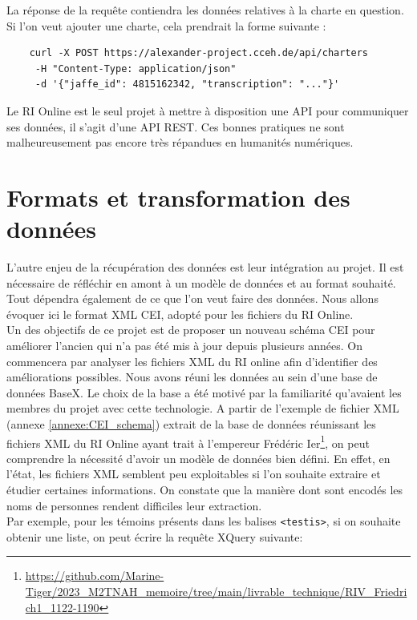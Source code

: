 \noindent La réponse de la requête contiendra les données relatives à la charte en question. 
Si l’on veut ajouter une charte, cela prendrait la forme suivante : 

\begin{lstlisting}
    curl -X POST https://alexander-project.cceh.de/api/charters
     -H "Content-Type: application/json"
     -d '{"jaffe_id": 4815162342, "transcription": "..."}' 
\end{lstlisting}


\noindent Le RI Online est le seul projet à mettre à disposition une API pour communiquer ses données, il s’agit d’une API REST. Ces bonnes pratiques ne sont malheureusement pas encore très répandues en humanités numériques.


    \section{Formats et transformation des données}

L’autre enjeu de la récupération des données est leur intégration au projet. Il est nécessaire de réfléchir en amont à un modèle de données et au format souhaité. Tout dépendra également de ce que l’on veut faire des données. Nous allons évoquer ici le format XML CEI, adopté pour les fichiers du RI Online.\\ 
Un des objectifs de ce projet est de proposer un nouveau schéma CEI pour améliorer l’ancien qui n’a pas été mis à jour depuis plusieurs années. On commencera par analyser les fichiers XML du RI online afin d’identifier des améliorations possibles. Nous avons réuni les données au sein d’une base de données BaseX. Le choix de la base a été motivé par la familiarité qu’avaient les membres du projet avec cette technologie. 
A partir de l'exemple de fichier XML (annexe \ref{annexe:CEI_schema}) extrait de la base de données réunissant les fichiers XML du RI Online ayant trait à l'empereur Frédéric Ier\footnote{\url{https://github.com/Marine-Tiger/2023_M2TNAH_memoire/tree/main/livrable_technique/RIV_Friedrich1_1122-1190}}, on peut comprendre la nécessité d'avoir un modèle de données bien défini. En effet, en l'état, les fichiers XML semblent peu exploitables si l'on souhaite extraire et étudier certaines informations. On constate que la manière dont sont encodés les noms de personnes rendent difficiles leur extraction. \\ 
Par exemple, pour les témoins présents dans les balises \verb|<testis>|, si on souhaite obtenir une liste, on peut écrire la requête XQuery suivante:\\

